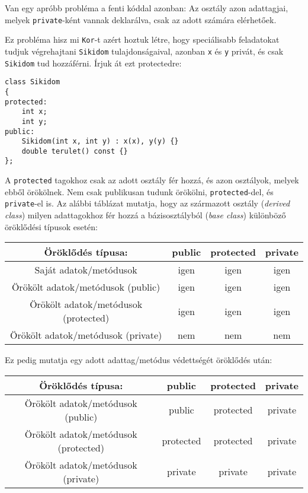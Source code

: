 \documentclass[a4paper,11.5pt]{article}
\begin{document}
	Van egy apróbb probléma a fenti kóddal azonban: Az osztály azon adattagjai, melyek \texttt{private}-ként vannak deklarálva, csak az adott számára elérhetőek.
	
	Ez probléma hisz mi \texttt{Kor}-t azért hoztuk létre, hogy speciálisabb feladatokat tudjuk végrehajtani \texttt{Sikidom} tulajdonságaival, azonban \texttt{x} és \texttt{y} privát, és csak \texttt{Sikidom} tud hozzáférni. Írjuk át ezt protectedre:
\begin{lstlisting}
class Sikidom
{
protected:
	int x;
	int y;
public:
	Sikidom(int x, int y) : x(x), y(y) {}
	double terulet() const {}
};
\end{lstlisting}
	A \texttt{protected} tagokhoz csak az adott osztály fér hozzá, és azon osztályok, melyek ebből örökölnek. Nem csak publikusan tudunk örökölni, \texttt{protected}-del, és \texttt{private}-el is. Az alábbi táblázat mutatja, hogy az származott osztály (\textit{derived class}) milyen adattagokhoz fér hozzá a bázisosztályból (\textit{base class}) különböző öröklődési típusok esetén:
	\begin{center}
		\begin{tabular}{|c||c|c|c|}
			\hline
			Öröklődés típusa:&public&protected&private\\
			\hline
			\hline
			Saját adatok/metódusok& \cellcolor{green!20}igen&\cellcolor{green!20}igen&\cellcolor{green!20}igen\\
			\hline
			Örökölt adatok/metódusok (public)&\cellcolor{green!20}igen&\cellcolor{green!20}igen&\cellcolor{green!20}igen\\
			\hline
			Örökölt adatok/metódusok (protected)&\cellcolor{green!20}igen&\cellcolor{green!20}igen&\cellcolor{green!20}igen\\
			\hline
			Örökölt adatok/metódusok (private)&\cellcolor{red!20}nem&\cellcolor{red!20}nem&\cellcolor{red!20}nem\\
			\hline
		\end{tabular}
	\end{center}
	Ez pedig mutatja egy adott adattag/metódus védettségét öröklődés után:
	\begin{center}
		\begin{tabular}{|c||c|c|c|}
			\hline
			Öröklődés típusa:&public&protected&private\\
			\hline
			\hline
			Örökölt adatok/metódusok (public)&\cellcolor{green!20}public&\cellcolor{orange!20}protected&\cellcolor{red!20}private\\
			\hline
			Örökölt adatok/metódusok (protected)&\cellcolor{orange!20}protected&\cellcolor{orange!20}protected&\cellcolor{red!20}private\\
			\hline
			Örökölt adatok/metódusok (private)&\cellcolor{red!20}private&\cellcolor{red!20}private&\cellcolor{red!20}private\\
			\hline
		\end{tabular}
	\end{center}
\end{document}
